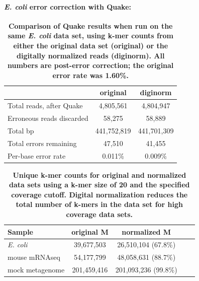 \documentclass{article}
\begin{document}
\paragraph{{\em E. coli} error correction with Quake:}


\begin{table}
\centering
\begin{tabular}{|l|c|c|}
\hline
                                 & original    & diginorm \\
\hline
Total reads, after Quake         & 4,805,561   & 4,804,947 \\
Erroneous reads discarded        & 58,275      & 58,889 \\
Total bp                         & 441,752,819 & 441,701,309 \\
Total errors remaining           & 47,510      & 41,455 \\
Per-base error rate              & 0.011\%     & 0.009\% \\
\hline
\end{tabular}

\caption{{\bf Comparison of Quake results when run on the same {\em
      E. coli} data set, using k-mer counts from either the original
    data set (original) or the digitally normalized reads
    (diginorm).  All numbers are post-error correction; the original
    error rate was 1.60\%.}}

\label{tab:quake_ecoli}
\end{table}


\begin{table}
\centering
\begin{tabular}{|l|c|c|c|c|}
\hline
Sample              & original M & normalized M \\
\hline
{\em E. coli}       & 39,677,503 & 26,510,104 (67.8\%) \\
mouse mRNAseq       & 54,177,799 & 48,058,631 (88.7\%) \\
mock metagenome     & 201,459,416  & 201,093,236 (99.8\%) \\
\hline
\end{tabular}

\caption{{\bf Unique k-mer counts for original and normalized data
    sets using a k-mer size of 20 and the specified coverage cutoff.
    Digital normalization reduces the total number of k-mers in the
    data set for high coverage data sets.}}

\label{tab:kmer_counts}
\end{table}
\end{document}

